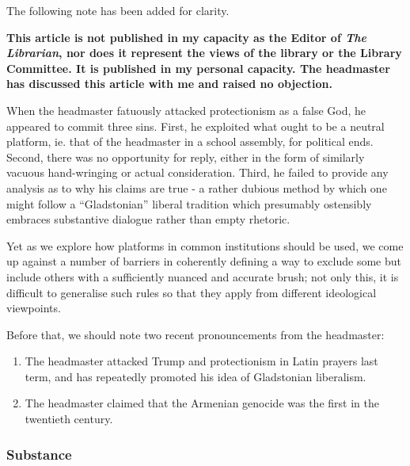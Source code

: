 \documentclass[12pt,a4paper]{report}
\begin{document}
\begin{multicols}{2}

The following note has been added for clarity.

\textbf{This article is not published in my capacity as the Editor of \textit{The Librarian}, nor does it represent the views of the library or the Library Committee. It is published in my personal capacity. The headmaster has discussed this article with me and raised no objection.
}

When the headmaster fatuously attacked protectionism as a false God, he
appeared to commit three sins. First, he exploited what ought to be a
neutral platform, ie. that of the headmaster in a school assembly, for
political ends. Second, there was no opportunity for reply, either in
the form of similarly vacuous hand-wringing or actual consideration.
Third, he failed to provide any analysis as to why his claims are true -
a rather dubious method by which one might follow a ``Gladstonian''
liberal tradition which presumably ostensibly embraces substantive
dialogue rather than empty rhetoric.

Yet as we explore how platforms in common institutions should be used,
we come up against a number of barriers in coherently defining a way to
exclude some but include others with a sufficiently nuanced and accurate
brush; not only this, it is difficult to generalise such rules so that
they apply from different ideological viewpoints.

Before that, we should note two recent pronouncements from the headmaster:
\begin{enumerate}
	\item The headmaster attacked Trump and protectionism in Latin prayers last term, and has repeatedly promoted his idea of Gladstonian liberalism.
	\item The headmaster claimed that the Armenian genocide was the first in the twentieth century.
\end{enumerate}

\subsubsection{Substance}\label{substance}


\end{multicols}
\end{document}
